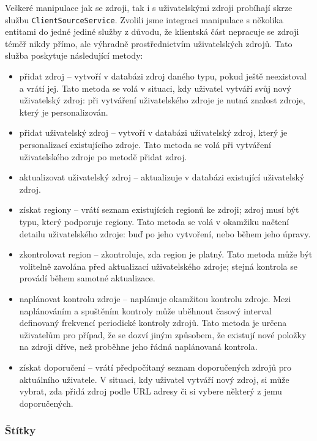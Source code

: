 Veškeré manipulace jak se zdroji, tak i s uživatelskými zdroji probíhají skrze službu \verb|ClientSourceService|.
Zvolili jsme integraci manipulace s několika entitami do jedné jediné služby z důvodu, že klientská část nepracuje se zdroji téměř nikdy přímo, ale výhradně prostřednictvím uživatelských zdrojů.
Tato služba poskytuje následující metody:
\begin{itemize}
	\item přidat zdroj -- vytvoří v databázi zdroj daného typu, pokud ještě neexistoval a vrátí jej.
		Tato metoda se volá v situaci, kdy uživatel vytváří svůj nový uživatelský zdroj: při vytváření uživatelského zdroje je nutná znalost zdroje, který je personalizován.
	\item přidat uživatelský zdroj -- vytvoří v databázi uživatelský zdroj, který je personalizací existujícího zdroje.
		Tato metoda se volá při vytváření uživatelského zdroje po metodě přidat zdroj.
	\item aktualizovat uživatelský zdroj -- aktualizuje v databázi existující uživatelský zdroj.
	\item získat regiony -- vrátí seznam existujících regionů ke zdroji; zdroj musí být typu, který podporuje regiony.
		Tato metoda se volá v okamžiku načtení detailu uživatelského zdroje: buď po jeho vytvoření, nebo během jeho úpravy.
	\item zkontrolovat region -- zkontroluje, zda region je platný.
		Tato metoda může být volitelně zavolána před aktualizací uživatelského zdroje; stejná kontrola se provádí během samotné aktualizace.
	\item naplánovat kontrolu zdroje -- naplánuje okamžitou kontrolu zdroje.
		Mezi naplánováním a spuštěním kontroly může uběhnout časový interval definovaný frekvencí periodické kontroly zdrojů.
		Tato metoda je určena uživatelům pro případ, že se dozví jiným způsobem, že existují nové položky na zdroji dříve, než proběhne jeho řádná naplánovaná kontrola.
	\item získat doporučení -- vrátí předpočítaný seznam doporučených zdrojů pro aktuálního uživatele.
		V situaci, kdy uživatel vytváří nový zdroj, si může vybrat, zda přidá zdroj podle URL adresy či si vybere některý z jemu doporučených.
\end{itemize}

\subsubsection{Štítky}


